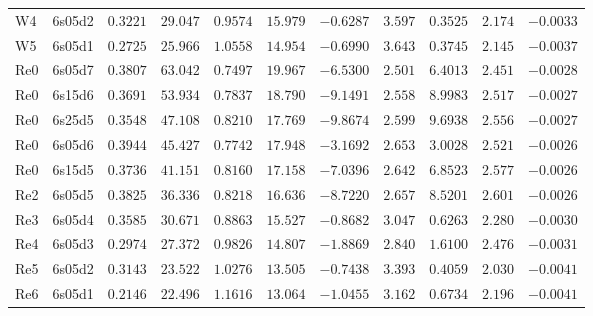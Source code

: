 \begin{table}[H]
{\begin{tabular}{llrrrrrrrrr}
W4 & 6s05d2 &$0.3221$ &$29.047$ &$0.9574$ &$15.979$ &$-0.6287$ &$3.597$ &$0.3525$ &$2.174$ &$-0.0033$ \\
W5 & 6s05d1 &$0.2725$ &$25.966$ &$1.0558$ &$14.954$ &$-0.6990$ &$3.643$ &$0.3745$ &$2.145$ &$-0.0037$ \\
Re0 & 6s05d7 &$0.3807$ &$63.042$ &$0.7497$ &$19.967$ &$-6.5300$ &$2.501$ &$6.4013$ &$2.451$ &$-0.0028$ \\
Re0 & 6s15d6 &$0.3691$ &$53.934$ &$0.7837$ &$18.790$ &$-9.1491$ &$2.558$ &$8.9983$ &$2.517$ &$-0.0027$ \\
Re0 & 6s25d5 &$0.3548$ &$47.108$ &$0.8210$ &$17.769$ &$-9.8674$ &$2.599$ &$9.6938$ &$2.556$ &$-0.0027$ \\
Re0 & 6s05d6 &$0.3944$ &$45.427$ &$0.7742$ &$17.948$ &$-3.1692$ &$2.653$ &$3.0028$ &$2.521$ &$-0.0026$ \\
Re0 & 6s15d5 &$0.3736$ &$41.151$ &$0.8160$ &$17.158$ &$-7.0396$ &$2.642$ &$6.8523$ &$2.577$ &$-0.0026$ \\
Re2 & 6s05d5 &$0.3825$ &$36.336$ &$0.8218$ &$16.636$ &$-8.7220$ &$2.657$ &$8.5201$ &$2.601$ &$-0.0026$ \\
Re3 & 6s05d4 &$0.3585$ &$30.671$ &$0.8863$ &$15.527$ &$-0.8682$ &$3.047$ &$0.6263$ &$2.280$ &$-0.0030$ \\
Re4 & 6s05d3 &$0.2974$ &$27.372$ &$0.9826$ &$14.807$ &$-1.8869$ &$2.840$ &$1.6100$ &$2.476$ &$-0.0031$ \\
Re5 & 6s05d2 &$0.3143$ &$23.522$ &$1.0276$ &$13.505$ &$-0.7438$ &$3.393$ &$0.4059$ &$2.030$ &$-0.0041$ \\
Re6 & 6s05d1 &$0.2146$ &$22.496$ &$1.1616$ &$13.064$ &$-1.0455$ &$3.162$ &$0.6734$ &$2.196$ &$-0.0041$ \\
\hline
\end{tabular}
}
\end{table}
